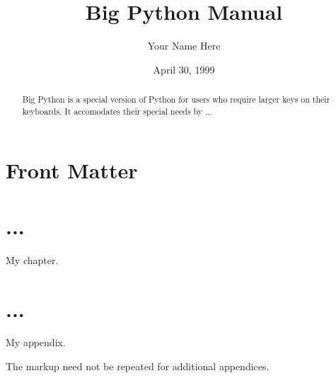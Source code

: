 \documentclass{manual}
\title{Big Python Manual}
\author{Your Name Here}
\date{April 30, 1999}		%
\begin{document}
\maketitle

\ifhtml
\chapter*{Front Matter\label{front}}
\fi

%

\begin{abstract}

\noindent
Big Python is a special version of Python for users who require larger 
keys on their keyboards.  It accomodates their special needs by ...

\end{abstract}

\tableofcontents


\chapter{...}

My chapter.


\appendix
\chapter{...}

My appendix.

The  markup need not be repeated for additional
appendices.


%
%
%
\renewcommand{\indexname}{Module Index}

\renewcommand{\indexname}{Index}
\end{document}
